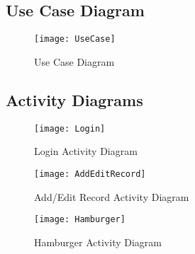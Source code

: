 \documentclass[
10pt, %
a4paper, %
oneside, %
headinclude,footinclude, %
BCOR5mm, %
]{scrartcl}
\begin{document}
\subsection{Use Case Diagram}
\label{sec:use_case_diagram}

\begin{figure}[htb]
\centering 
\texttt{[image: UseCase]} 
\caption{Use Case Diagram} 
\label{fig:use_case_diagram} 
\end{figure}

\subsection{Activity Diagrams}
\label{sec:activity_diagram}

\begin{figure}[htb]
\centering 
\texttt{[image: Login]} 
\caption{Login Activity Diagram} 
\label{fig:login} 
\end{figure}

\begin{figure}[htb]
\centering 
\texttt{[image: AddEditRecord]} 
\caption{Add/Edit Record Activity Diagram}
\label{fig:add_edit_record} 
\end{figure}

\begin{figure}[htb]
\centering 
\texttt{[image: Hamburger]} 
\caption{Hamburger Activity Diagram} 
\label{fig:hamburger} 
\end{figure}

\newpage



% 



\end{document}
